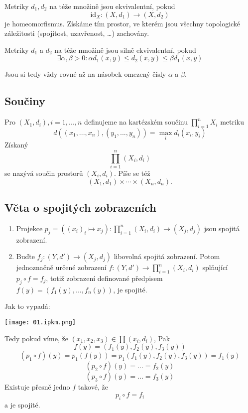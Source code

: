 \documentclass[../main.tex]{subfiles}
\begin{document}
\begin{definition}
	Metriky $d_1, d_2$ na téže množině jsou ekvivalentní, pokud $$\mathrm{id}_X : \left(X, d_1\right) \to (X, d_2)$$ je homeomorfismus. Získáme tím prostor, ve kterém jsou všechny topologické záležitosti (spojitost, uzavřenost, \ldots) zachovány.
\end{definition}


\begin{definition}
	Metriky $d_1$ a $d_2$ na téže množině jsou silně ekvivalentní, pokud
	\[\exists \alpha , \beta > 0: \alpha d_1(x,y) \leq d_2(x,y) \leq \beta d_1(x,y)\]

	Jsou si tedy vždy rovné až na násobek omezený čísly \(\alpha\) a \(\beta\).
\end{definition}

\subsection{Součiny}

\begin{definition}[Součin]
	Pro $(X_1,d_i), i = 1,...,n$ definujeme na kartézském součinu $\prod^n_{i=1}X_i$ metriku
	\[d((x_1,...,x_n),(y_1,...,y_n)) = \max_i d_i(x_i,y_i)\]
	Získaný
	\[\prod^n_{i=1}(X_i,d_i)\]
	se nazývá součin prostorů $(X_i, d_i)$. Píše se též 
	\[(X_1,d_1) \times \cdots \times (X_n,d_n).\]
\end{definition}

\subsection{Věta o spojitých zobrazeních}
\begin{theorem}
	\hfill
	\begin{enumerate}
	\item Projekce $p_j = ((x_i)_i \mapsto x_j) : \prod^n_{i=1}(X_i,d_i) \rightarrow (X_j,d_j)$ jsou spojitá zobrazení.
	
	\item Buďte $f_j:(Y,d') \rightarrow (X_j,d_j)$ libovolná spojitá zobrazení. Potom jednoznačně určené zobrazení 
	$f:(Y,d') \rightarrow \prod^n_{i=1}(X_i,d_i)$ splňující $p_j \circ f = f_j$, totiž zobrazení definované předpisem
	$f(y) = (f_1(y),...,f_n(y))$, je spojité.
	\end{enumerate}
\end{theorem}

\begin{intuition}
	Jak to vypadá:
	\begin{center}
	\texttt{[image: 01.ipkm.png]}
	\end{center}
	Tedy pokud víme, že $(x_1,x_2,x_3)\in \prod (x_i,d_i)$, Pak
	\[f(y) = (f_1(y),f_2(y),f_3(y))\]
	\[(p_1\circ f)(y) = p_1(f(y)) = p_1(f_1(y),f_2(y),f_3(y))=f_1(y)\]
	\[(p_2\circ f)(y) = ... = f_2(y)\]
	\[(p_3\circ f)(y) = ... = f_3(y)\]
	Existuje přesně jedno $f$ takové, že 
	\[p_i \circ f = f_i\]
	a je spojité.
\end{intuition}
\end{document}

